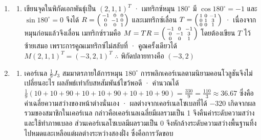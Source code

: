 \begin{enumerate}[label={},leftmargin=0pt,start=13]
    \item
    \begin{enumerate}[label=\textbf{\thechapter.\arabic{enumi}.\arabic*}]
        \item เขียนจุดในพิกัดเอกพันธุ์เป็น $(2, 1, 1)^T$ · เมทริกซ์หมุน $180^\circ$ มี $\cos 180^\circ = -1$ และ $\sin 180^\circ = 0$ จึงได้ $R = \begin{psmallmatrix} -1 & 0 & 0 \\ 0 & -1 & 0 \\ 0 & 0 & 1 \end{psmallmatrix}$ และเมทริกซ์เลื่อน $T = \begin{psmallmatrix} 1 & 0 & -1 \\ 0 & 1 & 3 \\ 0 & 0 & 1 \end{psmallmatrix}$ · เนื่องจากหมุนก่อนแล้วจึงเลื่อน เมทริกซ์รวมคือ $M = TR = \begin{psmallmatrix} -1 & 0 & -1 \\ 0 & -1 & 3 \\ 0 & 0 & 1 \end{psmallmatrix}$ โดยต้องเขียน $T$ ไว้ซ้ายเสมอ เพราะการคูณเมทริกซ์ไม่สลับที่ · คูณครั้งเดียวได้ $M(2,1,1)^T = (-3, 2, 1)^T$ $\therefore$ พิกัดปลายทางคือ $(-3, 2)$
    \end{enumerate}
    \item
    \begin{enumerate}[label=\textbf{\thechapter.\arabic{enumi}.\arabic*}]
        \item เคอร์เนล $\tfrac19 J_3$ สมมาตรภายใต้การหมุน $180^\circ$ การพลิกเคอร์เนลตามนิยามคอนโวลูชันจึงไม่เปลี่ยนอะไร ผลลัพธ์เท่ากับสหสัมพันธ์ไขว้พอดี · คำนวณได้ $\tfrac19(10+10+90+10+10+90+10+10+90) = \tfrac{330}{9} = \tfrac{110}{3} \approx 36.67$ ซึ่งคือค่าเฉลี่ยความสว่างของหน้าต่างนั่นเอง · ผลต่างจากเคอร์เนลโซเบลที่ได้ $-320$ เกิดจากผลรวมของสมาชิกในเคอร์เนล กล่าวคือเคอร์เนลเฉลี่ยมีผลรวมเป็น 1 จึงคืนค่าระดับความสว่างและใช้ทำภาพเบลอ ส่วนเคอร์เนลโซเบลมีผลรวมเป็น 0 จึงหักล้างระดับความสว่างพื้นฐานทิ้งไปหมดและเหลือแต่ผลต่างระหว่างสองฝั่ง ซึ่งคือการวัดขอบ
    \end{enumerate}
\end{enumerate}

